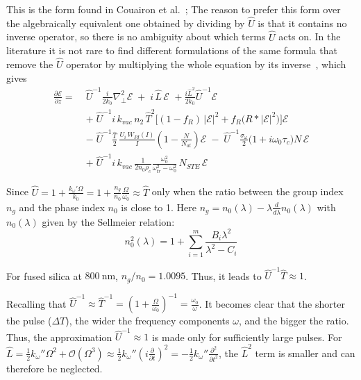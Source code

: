 This is the form found in Couairon et al.~\cite{PhysRevB.71.125435}; The reason to prefer this form over the algebraically equivalent one obtained by dividing by $\hat{U}$ is that it contains no inverse operator, so there is no ambiguity about which terms $\hat{U}$ acts on.
In the literature it is not rare to find different formulations of the same formula that remove the $\hat{U}$ operator by multiplying the whole equation by its inverse~\cite{chowdhury2005,wu2005femtosecond}, which gives
\begin{align}
\label{eq:master_divided}
\frac{\partial \mathcal{E}}{\partial z} = \;
&\hat{U}^{-1}\frac{i}{2k_0}\nabla_\perp^2 \mathcal{E}
\;+\;
i\,\hat{L}\,\mathcal{E} \,\,+ \frac{i\hat{L}^2}{2k_0}\hat{U}^{-1}\mathcal{E}\nonumber\\[4pt]
&+\;\hat{U}^{-1} i\,k_{vac}\,n_2\,\hat{T}^2\Big[(1-f_R)\,|\mathcal{E}|^2 + f_R\big(R * |\mathcal{E}|^2\big)\Big]\mathcal{E} \nonumber\\[4pt]
&-\;\hat{U}^{-1}\frac{\hat{T}}{2}\,\frac{U_i\,W_{PI}(I)}{I}\left(1-\frac{N}{N_{at}}\right)\mathcal{E}
\;-\;\hat{U}^{-1}\frac{\sigma_\omega}{2}\big(1+i\omega_0\tau_c\big)N\,\mathcal{E} \nonumber\\[4pt]
&+\;\hat{U}^{-1} i\,k_{vac}\,\frac{1}{2n_0\rho_c}\frac{\omega_0^2}{\omega_{tr}^2-\omega_0^2}\,N_{STE}\,\mathcal{E}
\end{align}

\noindent Since $\hat{U} = 1 + \frac{k_{\omega}'\Omega}{k_0} =1 +\frac{n_g}{n_0}\frac{\Omega}{\omega_0}\approx \hat{T}$ only when the ratio between the group index $n_g$ and the phase index $n_0$ is close to 1.
Here $n_g = n_0(\lambda) - \lambda \frac{d}{d\lambda}n_0(\lambda)$ with $n_0(\lambda)$ given by the Sellmeier relation:
\begin{equation*}
n_0^2(\lambda) = 1 + \sum_{i=1}^{m} \frac{B_i \lambda^2}{\lambda^2 - C_i}
\end{equation*}

\noindent For fused silica at $800\ \text{nm}$, $n_g/n_0=1.0095$. Thus, it leads to $\hat{U}^{-1}\hat{T} \approx 1$.

Recalling that $\hat{U}^{-1} \approx \hat{T}^{-1} = (1 + \frac{\Omega}{\omega_0})^{-1} = \frac{\omega_0}{\omega}$. It becomes clear that the shorter the pulse ($\Delta T$), the wider the frequency components $\omega$, and the bigger the ratio. Thus, the approximation $\hat{U}^{-1} \approx 1$ is made only for sufficiently large pulses.
For $\hat{L} = \tfrac12 k_\omega''\Omega^2 + \mathcal{O}(\Omega^3) \approx \tfrac12 k_\omega''(i\frac{\partial}{\partial t})^2 = -\tfrac12 k_\omega''\frac{\partial^2}{\partial t^2}$, the $\hat{L}^2$ term is smaller and can therefore be neglected.

